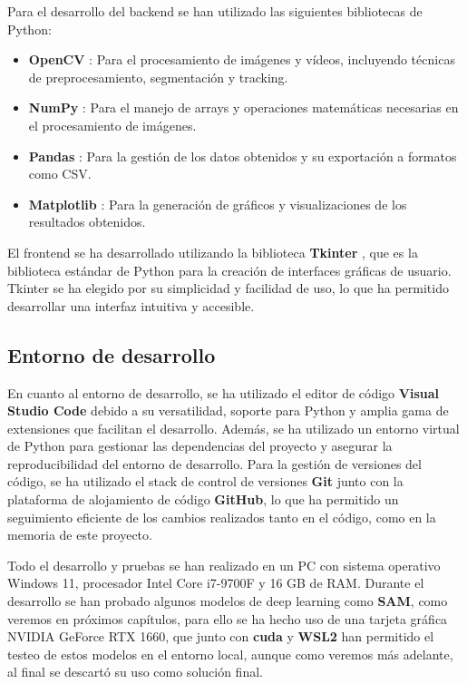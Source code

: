 Para el desarrollo del backend se han utilizado las siguientes bibliotecas de Python:
\begin{itemize}
    \item \textbf{OpenCV} \cite{opencv_library}: Para el procesamiento de imágenes y vídeos, incluyendo técnicas de preprocesamiento, segmentación y tracking.
    \item \textbf{NumPy} \cite{python_numpy}: Para el manejo de arrays y operaciones matemáticas necesarias en el procesamiento de imágenes.
    \item \textbf{Pandas} \cite{python_pandas}: Para la gestión de los datos obtenidos y su exportación a formatos como CSV.
    \item \textbf{Matplotlib} \cite{python_matplotlib}: Para la generación de gráficos y visualizaciones de los resultados obtenidos.
\end{itemize}

El frontend se ha desarrollado utilizando la biblioteca \textbf{Tkinter} \cite{tkinter_library}, que es la biblioteca estándar de Python para la creación de interfaces gráficas de usuario. Tkinter se ha elegido por su simplicidad y facilidad de uso, lo que ha permitido desarrollar una interfaz intuitiva y accesible.

\subsection{Entorno de desarrollo}

En cuanto al entorno de desarrollo, se ha utilizado el editor de código \textbf{Visual Studio Code} \cite{vscode_editor} debido a su versatilidad, soporte para Python y amplia gama de extensiones que facilitan el desarrollo. Además, se ha utilizado un entorno virtual de Python para gestionar las dependencias del proyecto y asegurar la reproducibilidad del entorno de desarrollo. Para la gestión de versiones del código, se ha utilizado el stack de control de versiones \textbf{Git} \cite{git_software} junto con la plataforma de alojamiento de código \textbf{GitHub}\cite{github_platform}, lo que ha permitido un seguimiento eficiente de los cambios realizados tanto en el código, como en la memoria de este proyecto.

Todo el desarrollo y pruebas se han realizado en un PC con sistema operativo Windows 11, procesador Intel Core i7-9700F y 16 GB de RAM. Durante el desarrollo se han probado algunos modelos de deep learning como \textbf{SAM}, como veremos en próximos capítulos, para ello se ha hecho uso de una tarjeta gráfica NVIDIA GeForce RTX 1660, que junto con \textbf{cuda} y \textbf{WSL2} han permitido el testeo de estos modelos en el entorno local, aunque como veremos más adelante, al final se descartó su uso como solución final.